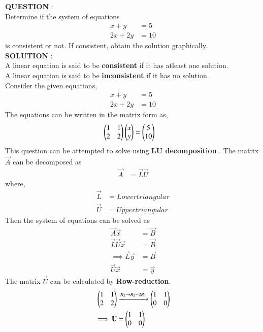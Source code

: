 \documentclass[journal]{IEEEtran}
\begin{document}
\textbf{QUESTION} : \\
Determine if the system of equations
\begin{align}
	x + y &= 5 \label{eq:qn} \\
	2x + 2y &= 10
\end{align}
is consistent or not. If consistent, obtain the solution graphically. \\
\textbf{SOLUTION} : \\
A linear equation is said to be \textbf{consistent} if it has atleast one solution. \\
A linear equation is said to be \textbf{inconsistent} if it has no solution. \\
Consider the given equations, 
\begin{align}
	x + y &= 5 \\
	2x + 2y &= 10
\end{align}
The equations can be written in the matrix form as, 
\begin{align}
	\begin{pmatrix}1 & 1 \\ 2 & 2\end{pmatrix} \begin{pmatrix}x \\ y\end{pmatrix} &= \begin{pmatrix}5 \\ 10 \end{pmatrix}
\end{align}
This question can be attempted to solve using \textbf{LU decomposition} . The matrix $\vec{A}$ can be decomposed as
\begin{align}
	\vec{A} &= \vec{L} \vec{U}
\end{align}
where, 
\begin{align}
	\vec{L} &= Lower triangular \\
	\vec{U} &= Upper triangular
\end{align}
Then the system of equations can be solved as
\begin{align}
	\vec{A} \vec{x} &= \vec{B} \label{eq:solve}\\
	\vec{L} \vec{U} \vec{x} &= \vec{B} \\
	\implies \vec{L} \vec{y} &= \vec{B} \label{eq:lu1} \\
	\vec{U} \vec{x} &= \vec{y} \label{eq:lu2}
\end{align}
The matrix $\vec{U}$ can be calculated by \textbf{Row-reduction}.
\begin{align}
	\begin{pmatrix}1 & 1 \\ 2 & 2\end{pmatrix} &\xrightarrow{R_{2} \rightarrow R_{2} - 2R_{1}} \begin{pmatrix}1 & 1 \\ 0 & 0\end{pmatrix} \\
	\implies \mathbf{U} &= \begin{pmatrix}1 & 1 \\ 0 & 0\end{pmatrix}
\end{align}
\end{document}
